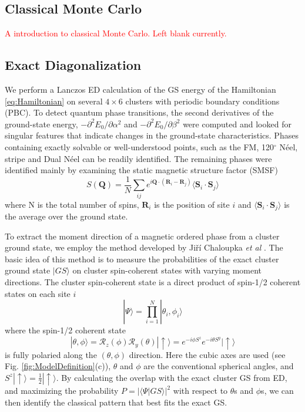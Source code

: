 \documentclass[aps,prb,reprint,groupedaddress,showpacs,amsfonts,amsmath,amssymb,superscriptaddress]{revtex4-1}
\begin{document}
\subsection{Classical Monte Carlo}
\textcolor{red}{A introduction to classical Monte Carlo. Left blank currently.}

\subsection{Exact Diagonalization}
We perform a Lanczos ED calculation of the GS energy of the Hamiltonian \eqref{eq:Hamiltonian} on several $4 \times 6$ clusters with periodic boundary conditions (PBC). To detect quantum phase transitions, the second derivatives of the ground-state energy, $-\partial^2E_0/\partial\alpha^2$ and $-\partial^2E_0/\partial\beta^2$ were computed and looked for singular features that indicate changes in the ground-state characteristics. Phases containing exactly solvable or well-understood points, such as the FM, 120$^\circ$ N\'{e}el, stripe and Dual N\'{e}el can be readily identified. The remaining phases were identified mainly by examining the static magnetic structure factor (SMSF)
\begin{equation}
    S(\mathbf{Q}) = \frac{1}{N} \sum_{ij}e^{i\mathbf{Q}\cdot(\mathbf{R}_i - \mathbf{R}_j)} \langle \mathbf{S}_i \cdot \mathbf{S}_j \rangle
    \label{eq:StaticStructureFactor}
\end{equation}
where N is the total number of spins, $\mathbf{R}_i$ is the position of site $i$ and $\langle \mathbf{S}_i \cdot \mathbf{S}_j \rangle$ is the average over the ground state.

To extract the moment direction of a magnetic ordered phase from a cluster ground state, we employ the method developed by Ji\v{r}\'{i} Chaloupka \emph{et  al} \cite{PhysRevB.94.064435}. The basic idea of this method is to measure the probabilities of the exact cluster ground state $|GS\rangle$ on cluster spin-coherent states with varying moment directions. The cluster spin-coherent state is a direct product of spin-1/2 coherent states on each site $i$
\begin{equation}
    |\Psi\rangle = \prod_{i=1}^N|\theta_i,\phi_i\rangle
    \label{eq:ClusterCoherentState}
\end{equation}
where the spin-1/2 coherent state
\begin{equation}
    |\theta, \phi \rangle = \mathcal{R}_z(\phi) \mathcal{R}_y(\theta) |\uparrow \rangle = e^{-i\phi S^z} e^{-i\theta S^y} |\uparrow\rangle
    \label{eq:Spin-1/2CoherentState}
\end{equation}
is fully polaried along the $(\theta, \phi)$ direction. Here the cubic axes are used (see Fig. \ref{fig:ModelDefinition}(c)), $\theta$ and $\phi$ are the conventional spherical angles, and $S^z |\uparrow \rangle = \frac{1}{2}|\uparrow \rangle$. By calculating the overlap with the exact cluster GS from ED, and maximizing the probability $P = |\langle \Psi | GS \rangle|^2$ with respect to $\theta$s and $\phi$s, we can then identify the classical pattern that best fits the exact GS.
\end{document}

